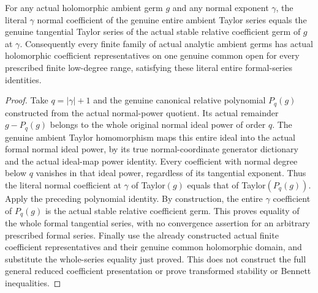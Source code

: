 \begin{theorem}
\label{hir:actual-relative-coefficient-literal-formal-taylor-dictionary}
\leanok
For any actual holomorphic ambient germ $g$ and any normal exponent
$\gamma$, the literal $\gamma$ normal coefficient of the genuine entire
ambient Taylor series equals the genuine tangential Taylor series of the
actual stable relative coefficient germ of $g$ at $\gamma$.
Consequently every finite family of actual analytic ambient germs has
actual holomorphic coefficient representatives on one genuine common open
for every prescribed finite low-degree range, satisfying these literal
entire formal-series identities.
\end{theorem}
\begin{proof}
Take $q=|\gamma|+1$ and the genuine canonical relative polynomial $P_q(g)$
constructed from the actual normal-power quotient. Its actual remainder
$g-P_q(g)$ belongs to the whole original normal ideal power of order $q$.
The genuine ambient Taylor homomorphism maps this entire ideal into the
actual formal normal ideal power, by its true normal-coordinate generator
dictionary and the actual ideal-map power identity. Every coefficient with
normal degree below $q$ vanishes in that ideal power, regardless of its
tangential exponent. Thus the literal normal coefficient at $\gamma$ of
Taylor$(g)$ equals that of Taylor$(P_q(g))$. Apply the preceding polynomial
identity. By construction, the entire $\gamma$ coefficient of $P_q(g)$ is
the actual stable relative coefficient germ. This proves equality of the
whole formal tangential series, with no convergence assertion for an
arbitrary prescribed formal series. Finally use the already constructed
actual finite coefficient representatives and their genuine common
holomorphic domain, and substitute the whole-series equality just proved.
This does not construct the full general reduced coefficient presentation
or prove transformed stability or Bennett inequalities.
\end{proof}
